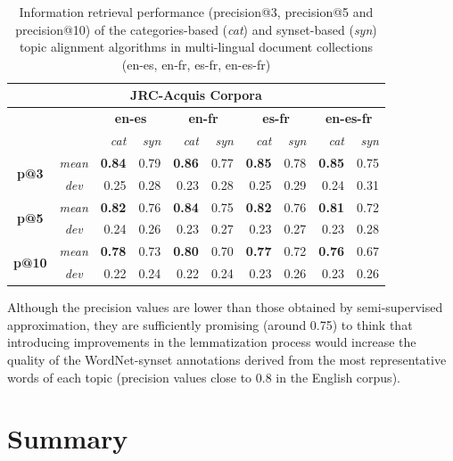 \begin{table}[ht]\centering
\begin{center}
\small
\begin{tabular}{cc|rr||rr||rr||rr}
    \hline
    \multicolumn{10}{c}{\textbf{JRC-Acquis Corpora}} \\
    \hline
    & & \multicolumn{2}{c}{\textbf{en-es}} &
      \multicolumn{2}{c}{\textbf{en-fr}} &
      \multicolumn{2}{c}{\textbf{es-fr}} &
      \multicolumn{2}{c}{\textbf{en-es-fr}} \\
    & & {\textit{cat}} & {\textit{syn}} & {\textit{cat}} & {\textit{syn}} & {\textit{cat}} & {\textit{syn}} & {\textit{cat}} & {\textit{syn}} \\
    \hline
    \multirow{2}{*}{\textbf{p@3}} 
    &{\textit{mean}}    &\textbf{0.84} &0.79 &\textbf{0.86} &0.77 &\textbf{0.85} &0.78 &\textbf{0.85} &0.75\\
    &{\textit{dev}}     &0.25 &0.28 &0.23 &0.28 &0.25 &0.29 &0.24 &0.31\\
    \hline
    \multirow{2}{*}{\textbf{p@5}} 
    &{\textit{mean}}    &\textbf{0.82} &0.76 &\textbf{0.84} &0.75 &\textbf{0.82} &0.76 &\textbf{0.81} &0.72\\
    &{\textit{dev}}     &0.24 &0.26 &0.23 &0.27 &0.23 &0.27 &0.23 &0.28\\
    \hline
    \multirow{2}{*}{\textbf{p@10}} 
    &{\textit{mean}}    &\textbf{0.78} &0.73 &\textbf{0.80} &0.70 &\textbf{0.77} &0.72 &\textbf{0.76} &0.67\\
    &{\textit{dev}}     &0.22 &0.24 &0.22 &0.24 &0.23 &0.26 &0.23 &0.26\\
\end{tabular}
\end{center}
\caption{Information retrieval performance (precision@3, precision@5 and precision@10) of the categories-based (\textit{cat}) and synset-based (\textit{syn}) topic alignment algorithms in multi-lingual document collections (en-es, en-fr, es-fr, en-es-fr)}
\label{tb:multi-ir}
\end{table}

Although the precision values are lower than those obtained by semi-supervised approximation, they are sufficiently promising (around 0.75) to think that introducing improvements in the lemmatization process would increase the quality of the WordNet-synset annotations derived from the most representative words of each topic (precision values close to 0.8 in the English corpus).

\section{Summary}
\label{sec:crosslingual-summary}

